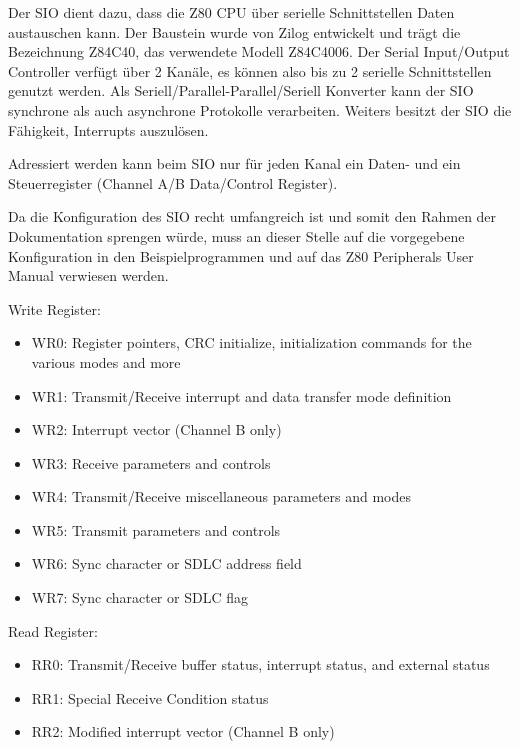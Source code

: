 Der SIO dient dazu, dass die Z80 CPU über serielle Schnittstellen Daten austauschen kann. Der Baustein wurde von Zilog entwickelt und trägt die Bezeichnung Z84C40, das verwendete Modell Z84C4006. Der Serial Input/Output Controller verfügt über 2 Kanäle, es können also bis zu 2 serielle Schnittstellen genutzt werden. Als Seriell/Parallel-Parallel/Seriell Konverter kann der SIO synchrone als auch asynchrone Protokolle verarbeiten. Weiters besitzt der SIO die Fähigkeit, Interrupts auszulösen.

Adressiert werden kann beim SIO nur für jeden Kanal ein Daten- und ein Steuerregister (Channel A/B Data/Control Register).

Da die Konfiguration des SIO recht umfangreich ist und somit den Rahmen der Dokumentation sprengen würde, muss an dieser Stelle auf die vorgegebene Konfiguration in den Beispielprogrammen und auf das Z80 Peripherals User Manual verwiesen werden.

Write Register:
\begin{itemize}
    \item WR0: Register pointers, CRC initialize, initialization commands for the various modes and more
    \item WR1: Transmit/Receive interrupt and data transfer mode definition
    \item WR2: Interrupt vector (Channel B only)
    \item WR3: Receive parameters and controls
    \item WR4: Transmit/Receive miscellaneous parameters and modes
    \item WR5: Transmit parameters and controls
    \item WR6: Sync character or SDLC address field
    \item WR7: Sync character or SDLC flag
\end{itemize}

Read Register:

\begin{itemize}
    \item RR0: Transmit/Receive buffer status, interrupt status, and external status
    \item RR1: Special Receive Condition status
    \item RR2: Modified interrupt vector (Channel B only)
\end{itemize}

